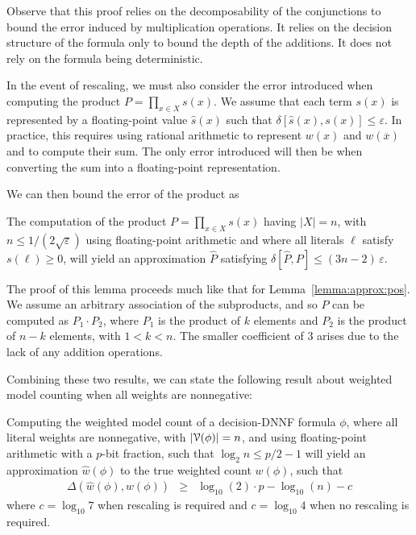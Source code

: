 \documentclass[letterpaper,USenglish,cleveref, autoref, thm-restate]{lipics-v2021}
\newcommand{\obar}[1]{\overline{#1}}
\newcommand{\lit}{\ell}
\newcommand{\approximate}[1]{\hat{#1}}
\newcommand{\approxP}{\approximate{P}}
\newcommand{\approxw}{\approximate{w}}
\newcommand{\approxs}{\approximate{s}}
\newcommand{\aerror}{\delta}
\newcommand{\digitprecision}{\Delta}
\newcommand{\roundepsilon}{\varepsilon}
\newcommand{\varset}{X}
\newcommand{\dependencyset}{{\cal V}}
\begin{document}
Observe that this proof relies on the decomposability of the
conjunctions to bound the error induced by multiplication operations.
It relies on the decision structure of the formula only to bound the
depth of the additions.  It does not rely on the formula being deterministic.

In the event of rescaling, we must also consider the error introduced
when computing the product $P = \prod_{x\in\varset} s(x)$.  We assume that
each term $s(x)$ is represented by a floating-point value
$\approxs(x)$ such that $\aerror[\approxs(x), s(x)] \leq
\roundepsilon$.  In practice, this requires using rational arithmetic
to represent $w(x)$ and $w(\obar{x})$ and to compute their sum.  The
only error introduced will then be when converting the sum into
a floating-point representation.

We can then bound the error of the product as
\begin{lemma}
  The computation of the product $P = \prod_{x\in\varset} s(x)$ having
$|\varset| = n$, with $n \leq 1/(2\sqrt{\roundepsilon})$ using floating-point arithmetic
and where all literals $\ell$ satisfy $s(\lit) \geq 0$,
will yield an approximation $\approxP$ satisfying
  $\aerror[\approxP, P] \leq (3n-2)\,\roundepsilon$.
  \label{lemma:approx:product}
\end{lemma}

The proof of this lemma proceeds much like that for Lemma~\ref{lemma:approx:pos}.  We assume an arbitrary association of the subproducts, and so $P$ can be computed as
$P_1 \cdot P_2$, where $P_1$ is the product of $k$ elements and $P_2$ is the product of $n-k$ elements, with $1 < k < n$.
The smaller coefficient of $3$ arises due to the lack of any addition operations.

Combining these two results, we can state the following result about weighted model counting when all weights are nonnegative:
\begin{theorem}
  \label{thm:approx:pos}
Computing the weighted model count of
a decision-DNNF formula $\phi$, where all literal weights are nonnegative, with $|\dependencyset(\phi)| = n$, and using floating-point arithmetic with a $p$-bit fraction, such that $\log_2 n \leq p/2-1$
will yield an approximation $\approxw(\phi)$ to the true weighted count $w(\phi)$, such that
\begin{eqnarray}
\digitprecision(\approxw(\phi), w(\phi)) & \geq & \log_{10}(2)\cdot p - \log_{10}(n) - c\label{eqn:precision:wmc}
\end{eqnarray}
where $c = \log_{10} 7$ when rescaling is required and $c = \log_{10} 4$ when no rescaling is required.
\end{theorem}
\end{document}
